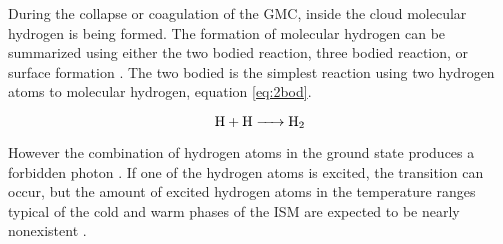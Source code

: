 During the collapse or coagulation of the GMC, inside the cloud molecular hydrogen is being formed.  The formation of molecular hydrogen can be summarized using either the two bodied reaction, three bodied reaction, or surface formation \citep{krumholz2014}.  The two bodied is the simplest reaction using two hydrogen atoms to molecular hydrogen, equation \ref{eq:2bod}.

\begin{equation}\label{eq:2bod}
  \ce{H + H -> H_2}
\end{equation}

However the combination of hydrogen atoms in the ground state produces a forbidden photon \citep{gould1963}.  If one of the hydrogen atoms is excited, the transition can occur, but the amount of excited hydrogen atoms in the temperature ranges typical of the cold and warm phases of the ISM are expected to be nearly nonexistent \citep{krumholz2014}.







